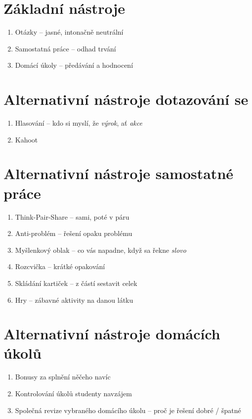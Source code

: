 \documentclass[twoside,openany,10pt]{book}
\begin{document}
\section*{Základní nástroje}
\begin{enumerate}
\item Otázky -- jasné, intonačně neutrální
\item Samostatná práce -- odhad trvání
\item Domácí úkoly -- předávání a hodnocení
\end{enumerate}

\section*{Alternativní nástroje dotazování se}
\begin{enumerate}
\item Hlasování -- kdo si myslí, že \textit{výrok}, ať \textit{akce}
\item Kahoot
\end{enumerate}

\section*{Alternativní nástroje samostatné práce}
\begin{enumerate}
\item Think-Pair-Share -- sami, poté v páru
\item Anti-problém -- řešení opaku problému
\item Myšlenkový oblak -- co vás napadne, když sa řekne \textit{slovo}
\item Rozcvička -- krátké opakování
\item Skládání kartiček -- z částí sestavit celek
\item Hry -- zábavné aktivity na danou látku
\end{enumerate}

\section*{Alternativní nástroje domácích úkolů}
\begin{enumerate}
\item Bonusy za splnění něčeho navíc
\item Kontrolování úkolů studenty navzájem
\item Společná revize vybraného domácího úkolu -- proč je řešení dobré / špatné
\end{enumerate}
\end{document}
